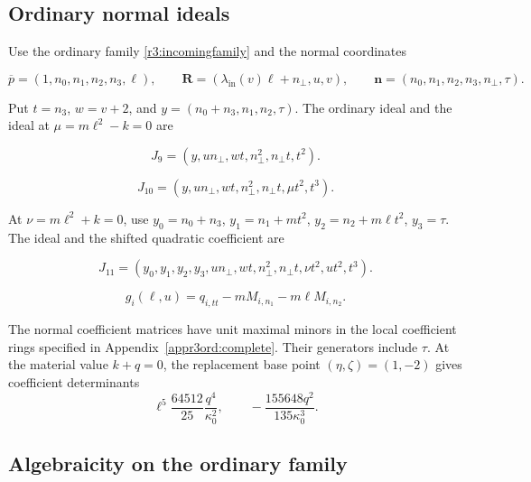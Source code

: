 \subsection{Ordinary normal ideals}

Use the ordinary family \eqref{r3:incomingfamily} and the
normal coordinates

\begin{equation}\label{supp:appr3:ordinarynormals}
 \overline p=(1,n_0,n_1,n_2,n_3,\ell),\qquad
 \boldsymbol R=(\lambda_{\mathrm{in}}(v)\ell+n_\perp,u,v),\qquad
 \boldsymbol n=(n_0,n_1,n_2,n_3,n_\perp,\tau).
\end{equation}

Put $t=n_3$, $w=v+2$, and
$y=(n_0+n_3,n_1,n_2,\tau)$. The ordinary ideal and the ideal at
$\mu=m\ell^2-k=0$ are

\begin{equation}\label{supp:appr3ord:Jnine}
 J_9=(y,un_\perp,wt,n_\perp^2,n_\perp t,t^2).
\end{equation}

\begin{equation}\label{supp:appr3ord:Jten}
 J_{10}=(y,un_\perp,wt,n_\perp^2,n_\perp t,\mu t^2,t^3).
\end{equation}

At $\nu=m\ell^2+k=0$, use
$y_0=n_0+n_3$, $y_1=n_1+mt^2$,
$y_2=n_2+m\ell t^2$, $y_3=\tau$. The ideal and the shifted
quadratic coefficient are

\begin{equation}\label{supp:appr3ord:Jeleven}
 J_{11}=(y_0,y_1,y_2,y_3,un_\perp,wt,n_\perp^2,n_\perp t,
                   \nu t^2,ut^2,t^3).
\end{equation}

\begin{equation}\label{supp:appr3ord:shiftedsquare}
 g_i(\ell,u)=q_{i,tt}-mM_{i,n_1}-m\ell M_{i,n_2}.
\end{equation}

The normal coefficient matrices have unit maximal minors in the
local coefficient rings specified in
Appendix~\ref{appr3ord:complete}. Their generators include
$\tau$. At the material value $k+q=0$, the replacement base point
$(\eta,\zeta)=(1,-2)$ gives coefficient determinants
\[
 \ell^5\frac{64512}{25}\frac{q^4}{\kappa_0^2},\qquad
 -\frac{155648q^2}{135\kappa_0^3}.
\]

\subsection{Algebraicity on the ordinary family}

